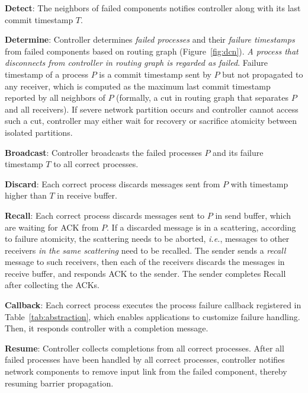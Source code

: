 \begin{ecompact}
\item \textbf{Detect}: The neighbors of failed components notifies controller along with its last commit timestamp $T$.
\item \textbf{Determine}: Controller determines \emph{failed processes} and their \emph{failure timestamps} from failed components based on routing graph (Figure~\ref{fig:dcn}). \emph{A process that disconnects from controller in routing graph is regarded as failed}.
Failure timestamp of a process $P$ is a commit timestamp sent by $P$ but not propagated to any receiver, which is computed as the maximum last commit timestamp reported by all neighbors of $P$ (formally, a cut in routing graph that separates $P$ and all receivers).
If severe network partition occurs and controller cannot access such a cut, controller may either wait for recovery or sacrifice atomicity between isolated partitions.
\item \textbf{Broadcast}: Controller broadcasts the failed processes $P$ and its failure timestamp $T$ to all correct processes.
\item \textbf{Discard}: Each correct process discards messages sent from $P$ with timestamp higher than $T$ in receive buffer.
\item \textbf{Recall}: Each correct process discards messages sent to $P$ in send buffer, which are waiting for ACK from $P$. If a discarded message is in a scattering, according to failure atomicity, the scattering needs to be aborted, \emph{i.e.}, messages to other receivers \emph{in the same scattering} need to be recalled. The sender sends a \emph{recall} message to such receivers, then each of the receivers discards the messages in receive buffer, and responds ACK to the sender. The sender completes Recall after collecting the ACKs.
\item \textbf{Callback}: Each correct process executes the process failure callback registered in Table~\ref{tab:abstraction}, which enables applications to customize failure handling. Then, it responds controller with a completion message.
\item \textbf{Resume}: Controller collects completions from all correct processes.
After all failed processes have been handled by all correct processes, controller notifies network components to remove input link from the failed component, thereby resuming barrier propagation.
\end{ecompact}

